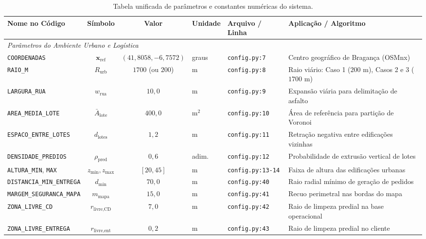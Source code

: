 \begin{table}[htbp]
\centering
\scriptsize
\caption{Tabela unificada de parâmetros e constantes numéricas do sistema.}\label{tab:parametros_unificados}
\begin{tabular}{p{3.2cm}ccp{1.2cm}p{3.2cm}p{3.8cm}}
\toprule
\textbf{Nome no Código} & \textbf{Símbolo} & \textbf{Valor} & \textbf{Unidade} & \textbf{Arquivo / Linha} & \textbf{Aplicação / Algoritmo} \\
\midrule
\multicolumn{6}{l}{\textit{Parâmetros do Ambiente Urbano e Logística}} \\
\texttt{COORDENADAS} & $\mathbf{x}_{\text{ref}}$ & $(41{,}8058, -6{,}7572)$ & graus & \texttt{config.py:7} & Centro geográfico de Bragança (OSMnx) \\
\texttt{RAIO\_M} & $R_{\text{urb}}$ & $1700$ (ou $200$) & m & \texttt{config.py:8} & Raio viário: Caso 1 ($200\text{ m}$), Casos 2 e 3 ($1700\text{ m}$) \\
\texttt{LARGURA\_RUA} & $w_{\text{rua}}$ & $10{,}0$ & m & \texttt{config.py:9} & Expansão viária para delimitação de asfalto \\
\texttt{AREA\_MEDIA\_LOTE} & $\bar{A}_{\text{lote}}$ & $400{,}0$ & $\text{m}^2$ & \texttt{config.py:10} & Área de referência para partição de Voronoi \\
\texttt{ESPACO\_ENTRE\_LOTES} & $d_{\text{lotes}}$ & $1{,}2$ & m & \texttt{config.py:11} & Retração negativa entre edificações vizinhas \\
\texttt{DENSIDADE\_PREDIOS} & $\rho_{\text{pred}}$ & $0{,}6$ & adim. & \texttt{config.py:12} & Probabilidade de extrusão vertical de lotes \\
\texttt{ALTURA\_MIN}, \texttt{MAX} & $z_{\text{min}}, z_{\text{max}}$ & $[20, 45]$ & m & \texttt{config.py:13-14} & Faixa de altura das edificações urbanas \\
\texttt{DISTANCIA\_MIN\_ENTREGA} & $d_{\text{min}}$ & $70{,}0$ & m & \texttt{config.py:40} & Raio radial mínimo de geração de pedidos \\
\texttt{MARGEM\_SEGURANCA\_MAPA} & $m_{\text{mapa}}$ & $15{,}0$ & m & \texttt{config.py:41} & Recuo perimetral nas bordas do mapa \\
\texttt{ZONA\_LIVRE\_CD} & $r_{\text{livre,CD}}$ & $7{,}0$ & m & \texttt{config.py:42} & Raio de limpeza predial na base operacional \\
\texttt{ZONA\_LIVRE\_ENTREGA} & $r_{\text{livre,ent}}$ & $0{,}2$ & m & \texttt{config.py:43} & Raio de limpeza predial no cliente \\

\end{tabular}
\end{table}
